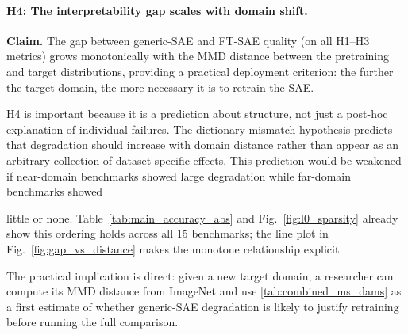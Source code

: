 \paragraph{H4: The interpretability gap scales with domain shift.}
\label{sec:exp:h4}

\textbf{Claim.}
The gap between generic-SAE and FT-SAE quality (on all H1--H3 metrics) grows
monotonically with the MMD distance between the pretraining and target distributions,
providing a practical deployment criterion: the further the target domain,
the more necessary it is to retrain the SAE.





H4 is important because it is a prediction about structure, not just a post-hoc explanation
of individual failures. The dictionary-mismatch hypothesis predicts that degradation should
increase with domain distance rather than appear as an arbitrary collection of dataset-specific
effects. This prediction would be weakened if near-domain benchmarks showed large degradation
while far-domain benchmarks showed



little or none.
Table~\ref{tab:main_accuracy_abs} and Fig.~\ref{fig:l0_sparsity} already show this ordering
holds across all 15 benchmarks; the line plot in Fig.~\ref{fig:gap_vs_distance} makes
the monotone relationship explicit.

The practical implication is direct: given a new target domain, a researcher can compute
its MMD distance from ImageNet and use \ref{tab:combined_ms_dams} as a first estimate of whether generic-SAE degradation is likely to justify retraining before running the full comparison.